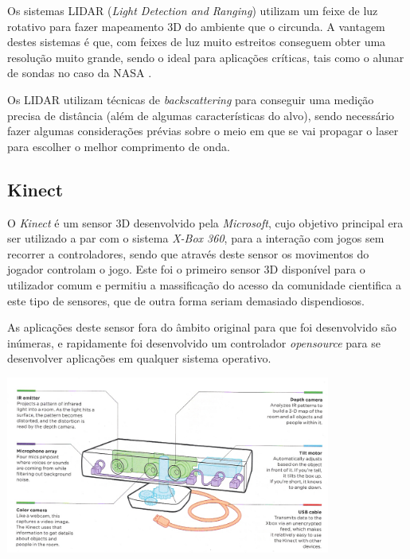 Os sistemas LIDAR (\emph{Light Detection and Ranging}) utilizam um feixe de luz rotativo para fazer mapeamento 3D
do ambiente que o circunda. A vantagem destes sistemas é que, com feixes de luz muito estreitos conseguem obter uma resolução muito grande, sendo o ideal para aplicações críticas, tais como o alunar de sondas no caso da NASA \cite{Keim2010}.

Os LIDAR utilizam técnicas de \emph{backscattering} para conseguir uma medição
precisa de distância (além de algumas características do alvo), sendo necessário fazer algumas considerações prévias sobre o meio em que se vai propagar o laser para escolher o melhor comprimento de onda.


\subsection{Kinect}\label{kinect}

O \emph{Kinect} é um sensor 3D desenvolvido pela \emph{Microsoft}, cujo objetivo principal era ser utilizado a par com o sistema \emph{X-Box 360}, para a interação com jogos sem recorrer a controladores, sendo que através deste sensor os movimentos do jogador controlam o jogo. Este foi o primeiro sensor 3D disponível para o utilizador comum e permitiu a massificação do acesso da comunidade cientifica a este tipo de sensores, que de outra forma seriam demasiado dispendiosos.

As aplicações deste sensor fora do âmbito original para que foi desenvolvido são inúmeras, e rapidamente foi desenvolvido um controlador \emph{opensource} para se desenvolver aplicações em qualquer sistema operativo.

\begin{center}
	\includegraphics[width=0.80\textwidth]{./figures/Kinect.png}
	\label{fig:5}
\end{center}

